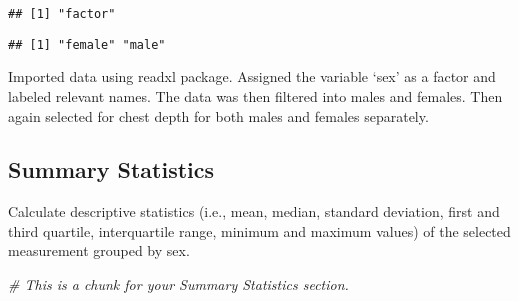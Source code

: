 \documentclass[]{article}
\newenvironment{Shaded}{\begin{snugshade}}{\end{snugshade}}
\newcommand{\CommentTok}[1]{\textcolor[rgb]{0.56,0.35,0.01}{\textit{#1}}}
\newcommand{\DecValTok}[1]{\textcolor[rgb]{0.00,0.00,0.81}{#1}}
\newcommand{\KeywordTok}[1]{\textcolor[rgb]{0.13,0.29,0.53}{\textbf{#1}}}
\newcommand{\NormalTok}[1]{#1}
\newcommand{\OperatorTok}[1]{\textcolor[rgb]{0.81,0.36,0.00}{\textbf{#1}}}
\newcommand{\StringTok}[1]{\textcolor[rgb]{0.31,0.60,0.02}{#1}}
\begin{document}
\begin{verbatim}
## [1] "factor"
\end{verbatim}

\begin{Shaded}
\end{Shaded}

\begin{verbatim}
## [1] "female" "male"
\end{verbatim}

\begin{Shaded}
\end{Shaded}

Imported data using readxl package. Assigned the variable `sex' as a
factor and labeled relevant names. The data was then filtered into males
and females. Then again selected for chest depth for both males and
females separately.

\hypertarget{summary-statistics}{%
\subsection{Summary Statistics}\label{summary-statistics}}

Calculate descriptive statistics (i.e., mean, median, standard
deviation, first and third quartile, interquartile range, minimum and
maximum values) of the selected measurement grouped by sex.

\begin{Shaded}
\begin{Highlighting}[]
\CommentTok{# This is a chunk for your Summary Statistics section. }
\end{Highlighting}
\end{Shaded}
\end{document}
